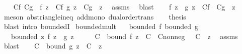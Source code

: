 \begin{isabellebody}
\ \ \isamarkupfalse%
\ C{\isacharunderscore}{\kern0pt}f\ C{\isacharunderscore}{\kern0pt}g\ \ {\isachardoublequoteopen}{\isasymbar}f\ z{\isasymbar}\ {\isasymle}\ C{\isacharunderscore}{\kern0pt}f{\isachardoublequoteclose}\ {\isachardoublequoteopen}{\isasymbar}g\ z{\isasymbar}\ {\isasymle}\ C{\isacharunderscore}{\kern0pt}g{\isachardoublequoteclose}\ \ z\ \isamarkupfalse%
\ assms\ \isamarkupfalse%
\ blast\isanewline
\ \ \isamarkupfalse%
\ {\isachardoublequoteopen}{\isasymbar}f\ z\ {\isacharplus}{\kern0pt}\ g\ z{\isasymbar}\ {\isasymle}\ C{\isacharunderscore}{\kern0pt}f\ {\isacharplus}{\kern0pt}\ C{\isacharunderscore}{\kern0pt}g{\isachardoublequoteclose}\ \ z\ \isamarkupfalse%
\ {\isacharparenleft}{\kern0pt}meson\ abs{\isacharunderscore}{\kern0pt}triangle{\isacharunderscore}{\kern0pt}ineq\ add{\isacharunderscore}{\kern0pt}mono\ dual{\isacharunderscore}{\kern0pt}order{\isachardot}{\kern0pt}trans{\isacharparenright}{\kern0pt}\isanewline
\ \ \isamarkupfalse%
\ {\isacharquery}{\kern0pt}thesis\ \isamarkupfalse%
\ {\isacharparenleft}{\kern0pt}blast\ intro{\isacharcolon}{\kern0pt}\ boundedI{\isacharparenright}{\kern0pt}\isanewline
{}\isamarkupfalse%
%
\endisatagproof
{\isafoldproof}%
%
\isadelimproof
\isanewline
%
\endisadelimproof
\isanewline
{}\isamarkupfalse%
\ bounded{\isacharunderscore}{\kern0pt}mult{\isacharcolon}{\kern0pt}\isanewline
\ \ \ {\isachardoublequoteopen}bounded\ f{\isachardoublequoteclose}\ {\isachardoublequoteopen}bounded\ g{\isachardoublequoteclose}\isanewline
\ \ \ {\isachardoublequoteopen}bounded\ {\isacharparenleft}{\kern0pt}{\isasymlambda}z{\isachardot}{\kern0pt}\ f\ z\ {\isacharasterisk}{\kern0pt}\ g\ z{\isacharparenright}{\kern0pt}{\isachardoublequoteclose}\isanewline
%
\isadelimproof
%
\endisadelimproof
%
\isatagproof
{}\isamarkupfalse%
\ {\isacharminus}{\kern0pt}\isanewline
\ \ \isamarkupfalse%
\ C\ \ bound{\isacharcolon}{\kern0pt}\ {\isachardoublequoteopen}{\isasymbar}f\ z{\isasymbar}\ {\isasymle}\ C{\isachardoublequoteclose}\ \ C{\isacharunderscore}{\kern0pt}nonneg{\isacharcolon}{\kern0pt}\ {\isachardoublequoteopen}{}\ {\isasymle}\ C{\isachardoublequoteclose}\ \ z\ \isamarkupfalse%
\ assms\ \isamarkupfalse%
\ blast\isanewline
\ \ \isamarkupfalse%
\ C{\isacharprime}{\kern0pt}\ \ bound{\isacharprime}{\kern0pt}{\isacharcolon}{\kern0pt}\ {\isachardoublequoteopen}{\isasymbar}g\ z{\isasymbar}\ {\isasymle}\ C{\isacharprime}{\kern0pt}{\isachardoublequoteclose}\ \ z\ \isamarkupfalse%

\end{isabellebody}
